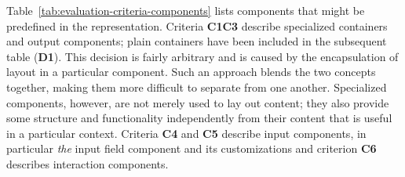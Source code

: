 Table~\ref{tab:evaluation-criteria-components} lists components that might be predefined in the representation.
Criteria \textbf{C1}\textendash\textbf{C3} describe specialized containers and output components;
plain containers have been included in the subsequent table (\textbf{D1}).
This decision is fairly arbitrary and is caused by the encapsulation of layout in a particular component.
Such an approach blends the two concepts together, making them more difficult to separate from one another.
Specialized components, however, are not merely used to lay out content;
they also provide some structure and functionality independently from their content that is useful in a particular context.
Criteria \textbf{C4} and \textbf{C5} describe input components, in particular \emph{the} input field component and its customizations and criterion \textbf{C6} describes interaction components.

